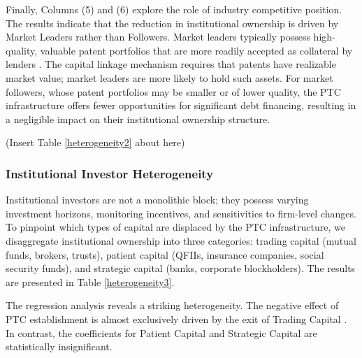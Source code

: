 \documentclass[12pt,a4paper]{article}
\begin{document}
Finally, Columns (5) and (6) explore the role of industry competitive position. The results indicate that the reduction in institutional ownership is driven by Market Leaders  rather than Followers. Market leaders typically possess high-quality, valuable patent portfolios that are more readily accepted as collateral by lenders \citep{hochberg2018patent}. The capital linkage mechanism requires that patents have realizable market value; market leaders are more likely to hold such assets. For market followers, whose patent portfolios may be smaller or of lower quality, the PTC infrastructure offers fewer opportunities for significant debt financing, resulting in a negligible impact on their institutional ownership structure.

\begin{center}
    (Insert Table \ref{heterogeneity2} about here)
\end{center}

\subsubsection{Institutional Investor Heterogeneity}
Institutional investors are not a monolithic block; they possess varying investment horizons, monitoring incentives, and sensitivities to firm-level changes. To pinpoint which types of capital are displaced by the PTC infrastructure, we disaggregate institutional ownership into three categories: trading capital (mutual funds, brokers, trusts), patient capital (QFIIs, insurance companies, social security funds), and strategic capital (banks, corporate blockholders). The results are presented in Table \ref{heterogeneity3}.

The regression analysis reveals a striking heterogeneity. The negative effect of PTC establishment is almost exclusively driven by the exit of Trading Capital . In contrast, the coefficients for Patient Capital and Strategic Capital are statistically insignificant.
\end{document}
